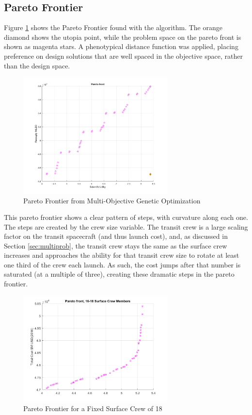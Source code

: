 \documentclass[]{aiaa-pretty}
\begin{document}
\subsection{Pareto Frontier}
Figure \ref{fig:gamultipareto} shows the Pareto Frontier found with the  algorithm. The orange diamond shows the utopia point, while the problem space on the pareto front is shown as magenta stars. A phenotypical distance function was applied, placing preference on design solutions that are well spaced in the objective space, rather than the design space.
\begin{figure}[h!]
	\centering
	\includegraphics[width=0.7\textwidth]{ga-multi-pareto}
	\caption{Pareto Frontier from Multi-Objective Genetic Optimization}
	\label{fig:gamultipareto}
\end{figure}

This pareto frontier shows a clear pattern of steps, with curvature along each one.  The steps are created by the crew size variable. The transit crew is a large scaling factor on the transit spacecraft (and thus launch cost), and, as discussed in Section \ref{sec:multiprob}, the transit crew stays the same as the surface crew increases and approaches the ability for that transit crew size to rotate at least one third of the crew each launch.  As such, the cost jumps after that number is saturated (at a multiple of three), creating these dramatic steps in the pareto frontier.

\begin{figure}[htb!]
	\centering
	\includegraphics[width=0.7\textwidth]{pareto18}
	\caption{Pareto Frontier for a Fixed Surface Crew of 18}
	\label{fig:pareto18}
\end{figure}
\end{document}
